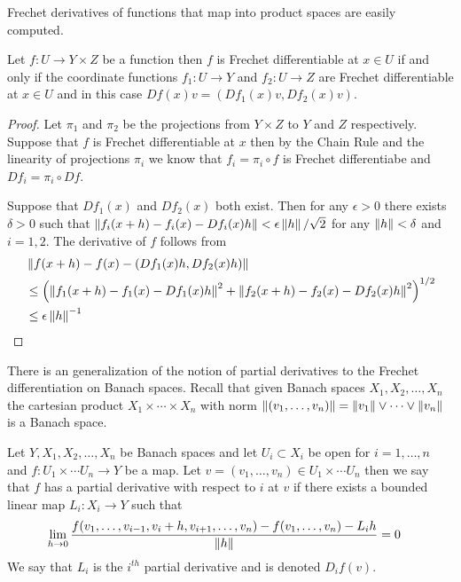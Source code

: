 Frechet derivatives of functions that map into product spaces are easily computed.
\begin{prop}\label{FrechetDerivativeProductSpaces}Let $f : U \to Y \times Z$ be a function then $f$ is Frechet differentiable at $x \in U$ if and only if the coordinate functions $f_1 : U \to Y$ and
$f_2 : U \to Z$ are Frechet differentiable at $x \in U$ and in this case $Df(x)v = (Df_1(x)v, Df_2(x)v)$.
\end{prop}
\begin{proof}
Let $\pi_1$ and $\pi_2$ be the projections from $Y \times Z$ to $Y$ and $Z$ respectively.  Suppose that $f$ is Frechet differentiable at $x$ then by the Chain Rule and the linearity of projections $\pi_i$ we know that $f_i = \pi_i \circ f$ is Frechet differentiabe and $D f_i = \pi_i \circ Df$.

Suppose that $D f_1(x)$ and $D f_2(x)$ both exist.  Then for any $\epsilon>0$ there exists $\delta>0$ such that $\left \lVert f_i(x+h) - f_i(x) - Df_i(x) h \right \rVert < \epsilon \left \lVert h \right \rVert/\sqrt{2}$ for any $\left \lVert h \right \rVert < \delta$ and $i=1,2$.   The derivative of $f$ follows from 
\begin{align*}
&\left \lVert f(x+h) - f(x) - (Df_1(x) h, Df_2(x) h) \right \rVert \\
&\leq \left(\left \lVert f_1(x+h) - f_1(x) - Df_1(x) h \right \rVert^2 +  \left \lVert f_2(x+h) - f_2(x) - Df_2(x) h \right \rVert^2 \right)^{1/2} \\
&\leq \epsilon \left \lVert h \right \rVert^{-1}
\end{align*}
\end{proof}

There is an generalization of the notion of partial derivatives to the Frechet differentiation on Banach spaces.
Recall that given Banach spaces $X_1, X_2, \dotsc, X_n$ the cartesian product $X_1 \times \dotsb \times X_n$ with norm
$\left \lVert (v_1, \dotsc, v_n) \right \rVert = \left \lVert v_1 \right \rVert \vee \dotsb \vee \left \lVert v_n \right \rVert$ is a Banach space.  
\begin{defn}Let $Y,X_1, X_2, \dotsc, X_n$ be Banach spaces and let $U_i \subset X_i$ be open for $i=1, \dotsc, n$ and $f : U_1 \times \dotsb U_n \to Y$ be a map.  Let 
$v=(v_1, \dotsc, v_n) \in U_1 \times \dotsb U_n$ then we say that $f$ has a partial derivative with respect to $i$ at $v$ if there exists a bounded linear map $L_i : X_i \to Y$ 
such that 
\begin{align*}
\lim_{h \to 0} \frac{f(v_1, \dotsc, v_{i-1}, v_i + h, v_{i+1}, \dotsc, v_n) - f(v_1, \dotsc, v_n) - L_i h}{\left \lVert h \right \rVert} &= 0
\end{align*}
We say that $L_i$ is the $i^{th}$ partial derivative and is denoted $D_i f (v)$.
\end{defn}

